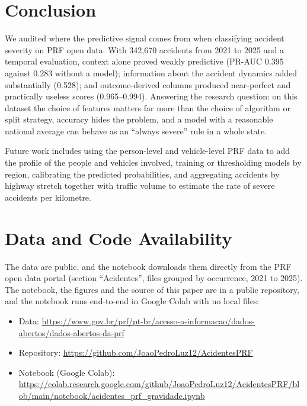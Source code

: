 \documentclass[12pt]{article}
\begin{document}
\section{Conclusion}

We audited where the predictive signal comes from when classifying accident
severity on PRF open data. With 342,670 accidents from 2021 to 2025 and a
temporal evaluation, context alone proved weakly predictive (PR-AUC 0.395
against 0.283 without a model); information about the accident dynamics added
substantially (0.528); and outcome-derived columns produced near-perfect and
practically useless scores (0.965--0.994). Answering the research question: on
this dataset the choice of features matters far more than the choice of
algorithm or split strategy, accuracy hides the problem, and a model with a
reasonable national average can behave as an ``always severe'' rule in a whole
state.

Future work includes using the person-level and vehicle-level PRF data to add
the profile of the people and vehicles involved, training or thresholding
models by region, calibrating the predicted probabilities, and aggregating
accidents by highway stretch together with traffic volume to estimate the rate
of severe accidents per kilometre.

\section*{Data and Code Availability}

The data are public, and the notebook downloads them directly from the PRF
open data portal (section ``Acidentes'', files grouped by occurrence, 2021 to
2025). The notebook, the figures and the source of this paper are in a public
repository, and the notebook runs end-to-end in Google Colab with no local
files:
\begin{itemize}\raggedright
\item Data: \url{https://www.gov.br/prf/pt-br/acesso-a-informacao/dados-abertos/dados-abertos-da-prf}
\item Repository: \url{https://github.com/JoaoPedroLuz12/AcidentesPRF}
\item Notebook (Google Colab): \url{https://colab.research.google.com/github/JoaoPedroLuz12/AcidentesPRF/blob/main/notebook/acidentes_prf_gravidade.ipynb}
\end{itemize}
\end{document}
